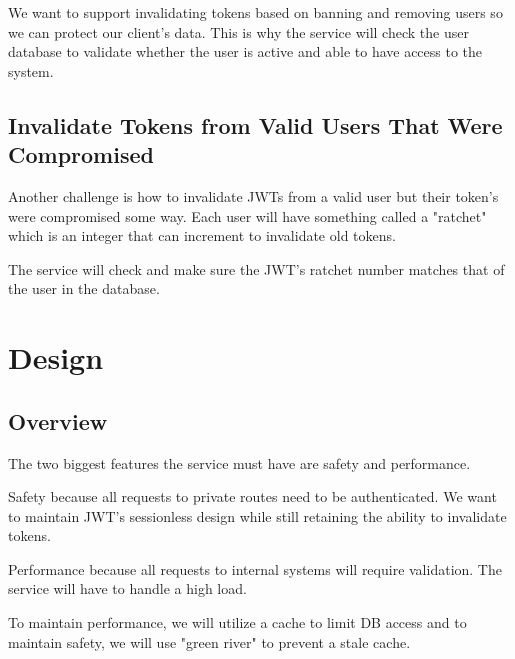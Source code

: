 \documentclass[11pt]{article}
\begin{document}
We want to support invalidating tokens based on banning and removing users so
we can protect our client's data. This is why the service will check the user 
database to validate whether the user is active and able to have access to the system.

\subsection{Invalidate Tokens from Valid Users That Were Compromised}

Another challenge is how to invalidate JWTs from a valid user but their
token's were compromised some way. Each user will have something called a "ratchet"
which is an integer that can increment to invalidate old tokens.

The service will check and make sure the JWT's ratchet number matches that of
the user in the database.

\section{Design}

\subsection{Overview}

The two biggest features the service must have are safety and performance.

Safety because all requests to private routes need to be authenticated. We want
to maintain JWT's sessionless design while still retaining the ability to invalidate
tokens.

Performance because all requests to internal systems will require validation.
The service will have to handle a high load.

To maintain performance, we will utilize a cache to limit DB access and to 
maintain safety, we will use "green river" to prevent a stale cache.

\end{document}
